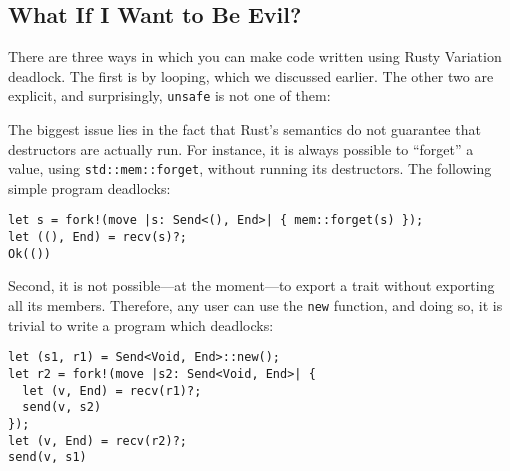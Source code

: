 \documentclass[sigconf,natbib=false]{acmart}
\begin{document}
\subsection{What If I Want to Be Evil?}\label{sec:limitations}
There are three ways in which you can make code written using Rusty Variation deadlock. The first is by looping, which we discussed earlier. The other two are explicit, and surprisingly, \lstinline{unsafe} is not one of them:

The biggest issue lies in the fact that Rust's semantics do not guarantee that destructors are actually run. For instance, it is always possible to ``forget'' a value, using \lstinline{std::mem::forget}, without running its destructors. The following simple program deadlocks:
\begin{lstlisting}
let s = fork!(move |s: Send<(), End>| { mem::forget(s) });
let ((), End) = recv(s)?;
Ok(())
\end{lstlisting}

Second, it is not possible---at the moment---to export a trait without exporting all its members. Therefore, any user can use the \lstinline{new} function, and doing so, it is trivial to write a program which deadlocks: 
\begin{lstlisting}
let (s1, r1) = Send<Void, End>::new();
let r2 = fork!(move |s2: Send<Void, End>| {
  let (v, End) = recv(r1)?;
  send(v, s2)
});
let (v, End) = recv(r2)?;
send(v, s1)
\end{lstlisting}

\clearpage
\printbibliography
\end{document}
